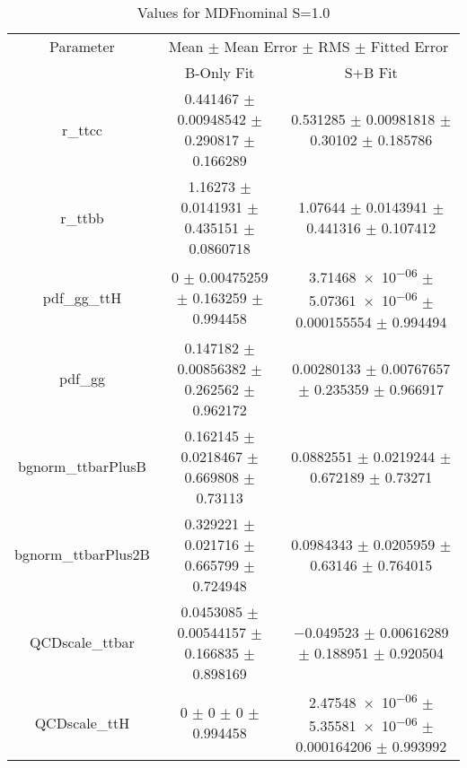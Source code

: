 \begin{table}
\centering
\caption{Values for MDFnominal S=1.0}
\begin{tabular}{ccc}
\toprule
Parameter & \multicolumn{2}{c}{Mean $\pm$ Mean Error $\pm$ RMS $\pm$ Fitted Error}\\
 & B-Only Fit & S+B Fit\\
\midrule
r\_ttcc & \num{0.441467} $\pm$ \num{0.00948542} $\pm$ \num{0.290817} $\pm$ \num{0.166289} & \num{0.531285} $\pm$ \num{0.00981818} $\pm$ \num{0.30102} $\pm$ \num{0.185786}\\
r\_ttbb & \num{1.16273} $\pm$ \num{0.0141931} $\pm$ \num{0.435151} $\pm$ \num{0.0860718} & \num{1.07644} $\pm$ \num{0.0143941} $\pm$ \num{0.441316} $\pm$ \num{0.107412}\\
pdf\_gg\_ttH & \num{0} $\pm$ \num{0.00475259} $\pm$ \num{0.163259} $\pm$ \num{0.994458} & \num{3.71468e-06} $\pm$ \num{5.07361e-06} $\pm$ \num{0.000155554} $\pm$ \num{0.994494}\\
pdf\_gg & \num{0.147182} $\pm$ \num{0.00856382} $\pm$ \num{0.262562} $\pm$ \num{0.962172} & \num{0.00280133} $\pm$ \num{0.00767657} $\pm$ \num{0.235359} $\pm$ \num{0.966917}\\
bgnorm\_ttbarPlusB & \num{0.162145} $\pm$ \num{0.0218467} $\pm$ \num{0.669808} $\pm$ \num{0.73113} & \num{0.0882551} $\pm$ \num{0.0219244} $\pm$ \num{0.672189} $\pm$ \num{0.73271}\\
bgnorm\_ttbarPlus2B & \num{0.329221} $\pm$ \num{0.021716} $\pm$ \num{0.665799} $\pm$ \num{0.724948} & \num{0.0984343} $\pm$ \num{0.0205959} $\pm$ \num{0.63146} $\pm$ \num{0.764015}\\
QCDscale\_ttbar & \num{0.0453085} $\pm$ \num{0.00544157} $\pm$ \num{0.166835} $\pm$ \num{0.898169} & \num{-0.049523} $\pm$ \num{0.00616289} $\pm$ \num{0.188951} $\pm$ \num{0.920504}\\
QCDscale\_ttH & \num{0} $\pm$ \num{0} $\pm$ \num{0} $\pm$ \num{0.994458} & \num{2.47548e-06} $\pm$ \num{5.35581e-06} $\pm$ \num{0.000164206} $\pm$ \num{0.993992}\\
\bottomrule
\end{tabular}
\end{table}